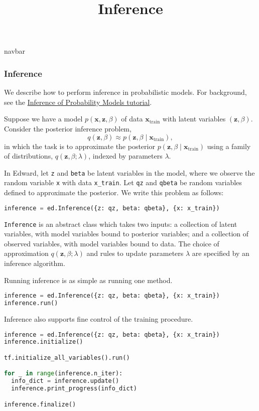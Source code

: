 \title{Inference}

{{navbar}}

\subsubsection{Inference}

We describe how to perform inference in probabilistic models.
For background, see the
\href{/tutorials/inference} {Inference of Probability Models
tutorial}.

Suppose we have a model $p(\mathbf{x}, \mathbf{z}, \beta)$ of data $\mathbf{x}_{\text{train}}$ with latent variables $(\mathbf{z}, \beta)$.
Consider the posterior inference problem,
\begin{equation*}
q(\mathbf{z}, \beta)\approx p(\mathbf{z}, \beta\mid \mathbf{x}_{\text{train}}),
\end{equation*}
in which the task is to approximate the posterior
$p(\mathbf{z}, \beta\mid \mathbf{x}_{\text{train}})$
using a family of distributions, $q(\mathbf{z},\beta; \lambda)$,
indexed by parameters $\lambda$.

In Edward, let \texttt{z} and \texttt{beta} be latent variables in the model,
where we observe the random variable \texttt{x} with
data \texttt{x_train}.
Let \texttt{qz} and \texttt{qbeta} be random variables defined to
approximate the posterior.
We write this problem as follows:

\begin{lstlisting}[language=Python]
inference = ed.Inference({z: qz, beta: qbeta}, {x: x_train})
\end{lstlisting}

\texttt{Inference} is an abstract class which
takes two inputs: a collection of latent variables, with model
variables bound to posterior variables; and a collection of observed
variables, with model variables bound to data.
The choice of approximation $q(\mathbf{z}, \beta; \lambda)$ and rules
to update parameters $\lambda$ are specified by an inference
algorithm.

Running inference is as simple as running one method.

\begin{lstlisting}[language=Python]
inference = ed.Inference({z: qz, beta: qbeta}, {x: x_train})
inference.run()
\end{lstlisting}

Inference also supports fine control of the training procedure.

\begin{lstlisting}[language=Python]
inference = ed.Inference({z: qz, beta: qbeta}, {x: x_train})
inference.initialize()

tf.initialize_all_variables().run()

for _ in range(inference.n_iter):
  info_dict = inference.update()
  inference.print_progress(info_dict)

inference.finalize()
\end{lstlisting}

